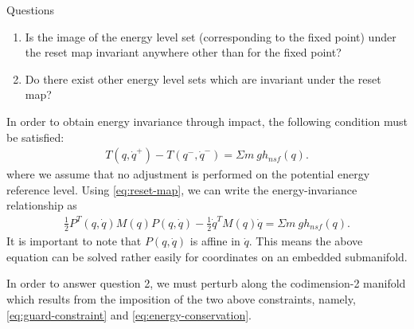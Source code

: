 \documentclass{article}
\begin{document}
{\large Questions}
\begin{enumerate}
\item Is the image of the energy level set (corresponding to the fixed point) under the reset map invariant anywhere other than for the fixed point?
\item Do there exist other energy level sets which are invariant under the reset map?
\end{enumerate}

In order to obtain energy invariance through impact, the following condition must be satisfied:
\begin{align*}
  T(q, {\dot q}^{+}) - T(q^{-}, {\dot q}^{-}) = \Sigma m \ g h_{\mathit{nsf}}(q).
\end{align*}
where we assume that no adjustment is performed on the potential energy reference level.
%
Using \eqref{eq:reset-map}, we can write the energy-invariance relationship as
\begin{align}
  \label{eq:energy-conservation}
  \frac{1}{2} P^{T}(q, {\dot q}) M(q) P(q, \dot q) - \frac{1}{2} {\dot q}^{T} M(q) {\dot q} = \Sigma m \ g h_{\mathit{nsf}}(q).
\end{align}
%
It is important to note that $P(q, {\dot q})$ is affine in ${\dot q}$. This means the above equation can be solved rather easily for coordinates on an embedded submanifold.

In order to answer question 2, we must perturb along the codimension-2 manifold which results from the imposition of the two above constraints, namely, \eqref{eq:guard-constraint} and \eqref{eq:energy-conservation}.
\end{document}
